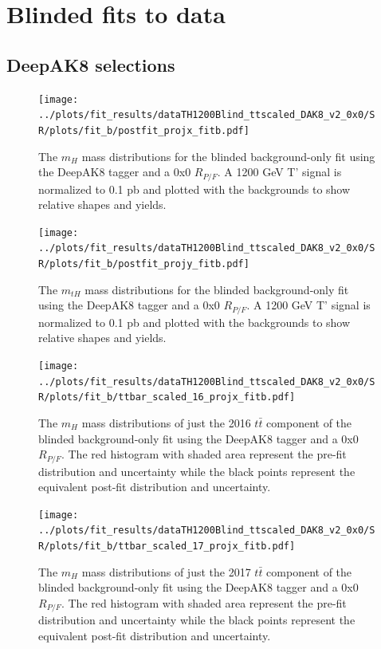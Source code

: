 \documentclass[10pt,oneside]{article}
\begin{document}
\section{Blinded fits to data}

\subsection{DeepAK8 selections}
\begin{figure}[H]
    \centering
    \texttt{[image: ../plots/fit\_results/dataTH1200Blind\_ttscaled\_DAK8\_v2\_0x0/SR/plots/fit\_b/postfit\_projx\_fitb.pdf]}
    \caption{The $m_H$ mass distributions for the blinded background-only fit using the DeepAK8 tagger and a 0x0 $R_{P/F}$.
    A 1200 GeV T' signal is normalized to 0.1 pb and plotted with the backgrounds to show relative shapes and yields.}
    \label{figs:DAK8_mh}
\end{figure}
\begin{figure}[H]
    \centering
    \texttt{[image: ../plots/fit\_results/dataTH1200Blind\_ttscaled\_DAK8\_v2\_0x0/SR/plots/fit\_b/postfit\_projy\_fitb.pdf]}
    \caption{The $m_{tH}$ mass distributions for the blinded background-only fit using the DeepAK8 tagger and a 0x0 $R_{P/F}$.
    A 1200 GeV T' signal is normalized to 0.1 pb and plotted with the backgrounds to show relative shapes and yields.}
    \label{figs:DAK8_mth}
\end{figure}
\begin{figure}[H]
    \centering
    \texttt{[image: ../plots/fit\_results/dataTH1200Blind\_ttscaled\_DAK8\_v2\_0x0/SR/plots/fit\_b/ttbar\_scaled\_16\_projx\_fitb.pdf]}
    \caption{The $m_H$ mass distributions of just the 2016 $t\bar{t}$ component of the blinded background-only fit using the DeepAK8 tagger and a 0x0 $R_{P/F}$.
    The red histogram with shaded area represent the pre-fit distribution and uncertainty while the black points represent the equivalent
    post-fit distribution and uncertainty.}
    \label{figs:DAK8_mth_tt16}
\end{figure}
\begin{figure}[H]
    \centering
    \texttt{[image: ../plots/fit\_results/dataTH1200Blind\_ttscaled\_DAK8\_v2\_0x0/SR/plots/fit\_b/ttbar\_scaled\_17\_projx\_fitb.pdf]}
    \caption{The $m_H$ mass distributions of just the 2017 $t\bar{t}$ component of the blinded background-only fit using the DeepAK8 tagger and a 0x0 $R_{P/F}$.
    The red histogram with shaded area represent the pre-fit distribution and uncertainty while the black points represent the equivalent
    post-fit distribution and uncertainty.}
    \label{figs:DAK8_mth_tt17}
\end{figure}
\end{document}
